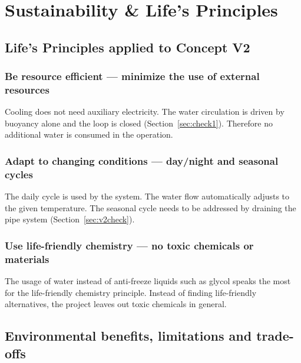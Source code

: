 \section{Sustainability \& Life's Principles}
\label{sec:sustainability}

\subsection{Life's Principles applied to Concept V2}
\label{sec:lp_applied}

\subsubsection{Be resource efficient --- minimize the use of external resources}
\label{sec:lp_resource}

Cooling does not need auxiliary electricity.
The water circulation is driven by buoyancy alone and the loop is closed (Section~\ref{sec:check1}).
Therefore no additional water is consumed in the operation.

\subsubsection{Adapt to changing conditions --- day/night and seasonal cycles}
\label{sec:lp_adapt}

The daily cycle is used by the system.
The water flow automatically adjusts to the given temperature.
The seasonal cycle needs to be addressed by draining the pipe system (Section~\ref{sec:v2check}).

\subsubsection{Use life-friendly chemistry --- no toxic chemicals or materials}
\label{sec:lp_chemistry}
The usage of water instead of anti-freeze liquids such as glycol speaks the most for the life-friendly chemistry principle.
Instead of finding life-friendly alternatives, the project leaves out toxic chemicals in general.

\subsection{Environmental benefits, limitations and trade-offs}
\label{sec:benefits}

